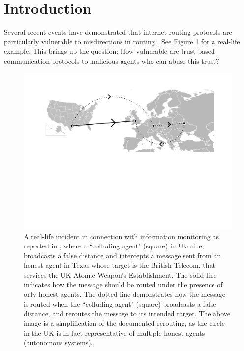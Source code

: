 \documentclass{comnet}
\begin{document}
\section{Introduction}
Several recent events have demonstrated that internet routing protocols are particularly vulnerable to misdirections in routing \cite{GormanV13, JimCowie, Madory, Goodin}.  See Figure \ref{fig:rerout} for a real-life example. This brings up the question: How vulnerable are trust-based communication protocols to malicious agents who can abuse this trust?

\begin{figure}
\centering
\includegraphics[width=1 \textwidth]{images/BGP4.pdf}
\caption{A real-life incident in connection with information monitoring as reported in \cite{Madory}, where a ``colluding agent" (square) in Ukraine, broadcasts a false distance and intercepts a message sent from an honest agent in Texas whose target is the British Telecom, that services the UK Atomic Weapon's Establishment. The solid line indicates how the message should be routed under the presence of only honest agents.  The dotted line demonstrates how the message is routed when the ``colluding agent" (square) broadcasts a false distance, and reroutes the message to its intended target.  The above image is a simplification of the documented rerouting, as the circle in the UK is in fact representative of multiple honest agents (autonomous systems).%
}
\label{fig:rerout}
\end{figure}
\end{document}
